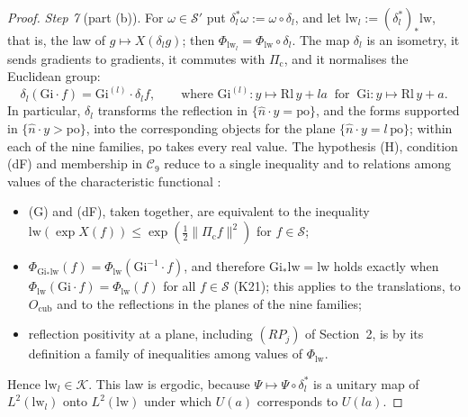 \documentclass[11pt]{amsart}
\theoremstyle{definition}
\begin{document}
\begin{proof}
\emph{Step 7} (part (b)).
For $\omega\in\mathcal S'$ put $\delta_l^*\omega:=\omega\circ\delta_l$, and let $\mathrm{lw}_l:=(\delta_l^*)_*\mathrm{lw}$, that is, the law of $g\mapsto X(\delta_lg)$; then $\Phi_{\mathrm{lw}_l}=\Phi_{\mathrm{lw}}\circ\delta_l$.
The map $\delta_l$ is an isometry, it sends gradients to gradients, it commutes with $\Pi_{\mathrm c}$, and it normalises the Euclidean group:
\begin{equation*}
\delta_l(\mathrm{Gi}\cdot f)=\mathrm{Gi}^{(l)}\cdot\delta_lf,\qquad\text{where }\mathrm{Gi}^{(l)}\colon y\mapsto\mathrm{Rl}\,y+la\ \text{ for }\ \mathrm{Gi}\colon y\mapsto\mathrm{Rl}\,y+a.
\end{equation*}
In particular, $\delta_l$ transforms the reflection in $\{\hat n\cdot y=\mathrm{po}\}$, and the forms supported in $\{\hat n\cdot y>\mathrm{po}\}$, into the corresponding objects for the plane $\{\hat n\cdot y=l\,\mathrm{po}\}$; within each of the nine families, $\mathrm{po}$ takes every real value.
The hypothesis (H), condition (dF) and membership in $\mathcal C_9$ reduce to a single inequality and to relations among values of the characteristic functional \cite[Section~1.2, Definition~2.38, Remark~14.4]{QEDII}:
\begin{itemize}
\item[(i)] (G) and (dF), taken together, are equivalent to the inequality $\mathrm{lw}(\exp X(f))\le\exp(\frac12\|\Pi_{\mathrm c}f\|^2)$ for $f\in\mathcal S$;
\item[(ii)] $\Phi_{\mathrm{Gi}_*\mathrm{lw}}(f)=\allowbreak \Phi_{\mathrm{lw}}(\mathrm{Gi}^{-1}\cdot f)$, and therefore $\mathrm{Gi}_*\mathrm{lw}=\mathrm{lw}$ holds exactly when $\Phi_{\mathrm{lw}}(\mathrm{Gi}\cdot f)=\Phi_{\mathrm{lw}}(f)$ for all $f\in\mathcal S$ (K21); this applies to the translations, to $O_{\mathrm{cub}}$ and to the reflections in the planes of the nine families;
\item[(iii)] reflection positivity at a plane, including $(RP_j)$ of Section~2, is by its definition a family of inequalities among values of $\Phi_{\mathrm{lw}}$.
\end{itemize}
Hence $\mathrm{lw}_l\in\mathcal K$.
This law is ergodic, because $\Psi\mapsto\Psi\circ\delta_l^*$ is a unitary map of $L^2(\mathrm{lw}_l)$ onto $L^2(\mathrm{lw})$ under which $U(a)$ corresponds to $U(la)$.


\end{proof}
\end{document}
